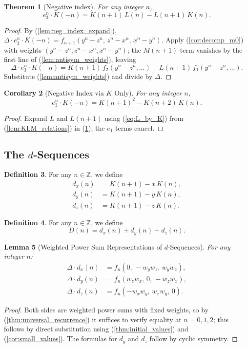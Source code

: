 \documentclass[12pt]{article}
\newtheorem{theorem}{Theorem}[section]
\newtheorem{lemma}[theorem]{Lemma}
\newtheorem{corollary}[theorem]{Corollary}
\theoremstyle{definition}
\newtheorem{definition}[theorem]{Definition}
\begin{document}
	\begin{theorem}[Negative index]
		\label{thm:negative_index}
		For any integer $n$,
		\[ e_3^n \cdot K(-n) = K(n+1)\,L(n) - L(n+1)\,K(n). \]
	\end{theorem}
	\begin{proof}
		By (\ref{lem:neg_index_expand}), $\Delta \cdot e_3^n \cdot K(-n) = f_{n+1}(y^n-z^n,\, z^n-x^n,\, x^n-y^n)$.
		Apply (\ref{cor:decomp_m0}) with weights $(y^n-z^n, z^n-x^n, x^n-y^n)$; the $M(n+1)$ term vanishes by the first line of (\ref{lem:antisym_weights}), leaving
		\[ \Delta \cdot e_3^n \cdot K(-n) = K(n+1)\,f_2(y^n-z^n, \ldots) + L(n+1)\,f_1(y^n-z^n, \ldots). \]
		Substitute (\ref{lem:antisym_weights}) and divide by $\Delta$.
	\end{proof}
	
	\begin{corollary}[Negative Index via $K$ Only]
		\label{cor:negative_index_K}
		For any integer $n$,
		\[ e_3^n \cdot K(-n) = K(n+1)^2 - K(n+2)\,K(n). \]
	\end{corollary}
	\begin{proof}
		Expand $L$ and $L(n+1)$ using (\ref{eq:L_by_K}) from (\ref{lem:KLM_relations}) in (\ref{thm:negative_index}); the $e_1$ terms cancel.
	\end{proof}
	
	\subsection{The $d$-Sequences}
	
	\begin{definition}
		For any $n \in \mathbb{Z}$, we define
		\begin{align*}
			d_x(n) &= K(n+1) - x\,K(n), \\
			d_y(n) &= K(n+1) - y\,K(n), \\
			d_z(n) &= K(n+1) - z\,K(n).
		\end{align*}
	\end{definition}
	
	\begin{definition}
		For any $n \in \mathbb{Z}$, we define
		\[ D(n) = d_x(n) + d_y(n) + d_z(n). \]
	\end{definition}
	
	\begin{lemma}[Weighted Power Sum Representations of $d$-Sequences]
		\label{lem:D_weights}
		For any integer $n$:
		\begin{align*}
			\Delta\cdot d_x(n) &= f_n(0,\, -w_y w_z,\, w_y w_z), \\[4pt]
			\Delta\cdot d_y(n) &= f_n(w_z w_x,\, 0,\, -w_z w_x), \\[4pt]
			\Delta\cdot d_z(n) &= f_n(-w_x w_y,\, w_x w_y,\, 0).
		\end{align*}
	\end{lemma}
	\begin{proof}
		Both sides are weighted power sums with fixed weights, so by (\ref{thm:universal_recurrence}) it suffices to verify equality at $n = 0, 1, 2$; this follows by direct substitution using (\ref{thm:initial_values}) and (\ref{cor:small_values}). The formulas for $d_y$ and $d_z$ follow by cyclic symmetry.
	\end{proof}
	
\end{document}
